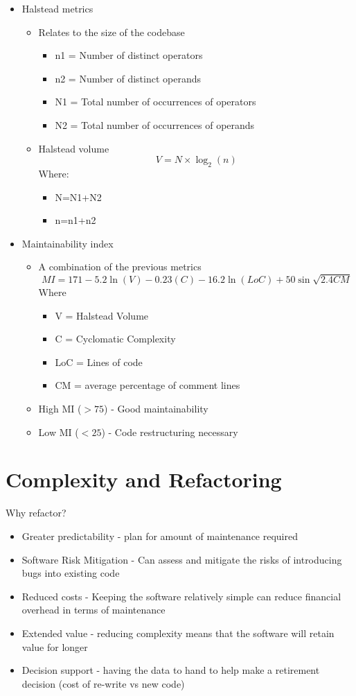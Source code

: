 \documentclass{article}[18pt]
\begin{document}
\begin{itemize}
\begin{itemize}
	\end{itemize}
	\item Halstead metrics
	\begin{itemize}
		\item Relates to the size of the codebase
		\begin{itemize}
			\item n1 = Number of distinct operators
			\item n2 = Number of distinct operands
			\item N1 = Total number of occurrences of operators
			\item N2 = Total number of occurrences of operands
		\end{itemize}
		\item Halstead volume
		$$V=N\times \log_2(n)$$
		Where:
		\begin{itemize}
			\item N=N1+N2
			\item n=n1+n2
		\end{itemize}
	\end{itemize}
	\item Maintainability index
	\begin{itemize}
		\item A combination of the previous metrics
		$$MI = 171-5.2\ln(V)-0.23(C)-16.2\ln(LoC)+50\sin\sqrt{2.4CM}$$
		Where
		\begin{itemize}
			\item V = Halstead Volume
			\item C = Cyclomatic Complexity
			\item LoC = Lines of code
			\item CM = average percentage of comment lines
		\end{itemize}
		\item High MI ($>75$) - Good maintainability
		\item Low MI ($<25$) - Code restructuring necessary
	\end{itemize}
\end{itemize}
\section{Complexity and Refactoring}
Why refactor?
\begin{itemize}
	\item Greater predictability - plan for amount of maintenance required
	\item Software Risk Mitigation - Can assess and mitigate the risks of introducing bugs into existing code
	\item Reduced costs - Keeping the software relatively simple can reduce financial overhead in terms of maintenance
	\item Extended value - reducing complexity means that the software will retain value for longer
	\item Decision support - having the data to hand to help make a retirement decision (cost of re-write vs new code)
\end{itemize}
\end{document}
